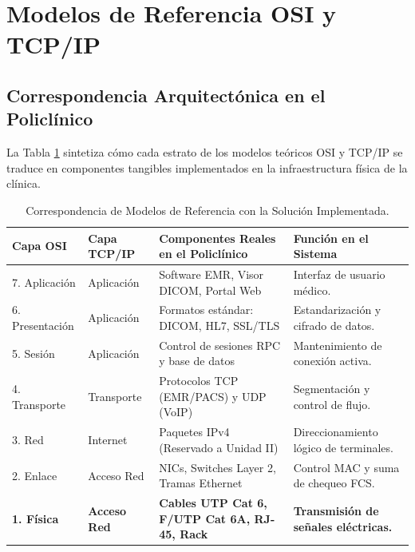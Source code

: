 \documentclass[11pt,a4paper]{article}
\begin{document}
\section{Modelos de Referencia OSI y TCP/IP}

\subsection{Correspondencia Arquitectónica en el Policlínico}
La Tabla \ref{tab:modelos} sintetiza cómo cada estrato de los modelos teóricos OSI y TCP/IP se traduce en componentes tangibles implementados en la infraestructura física de la clínica.

\begin{table}[h!]
\centering
\small
\caption{Correspondencia de Modelos de Referencia con la Solución Implementada.}
\label{tab:modelos}
\begin{tabularx}{\textwidth}{l l p{4.2cm} X}
\toprule
\textbf{Capa OSI} & \textbf{Capa TCP/IP} & \textbf{Componentes Reales en el Policlínico} & \textbf{Función en el Sistema} \\
\midrule
7. Aplicación & Aplicación & Software EMR, Visor DICOM, Portal Web & Interfaz de usuario médico. \\
6. Presentación & Aplicación & Formatos estándar: DICOM, HL7, SSL/TLS & Estandarización y cifrado de datos. \\
5. Sesión & Aplicación & Control de sesiones RPC y base de datos & Mantenimiento de conexión activa. \\
4. Transporte & Transporte & Protocolos TCP (EMR/PACS) y UDP (VoIP) & Segmentación y control de flujo. \\
3. Red & Internet & Paquetes IPv4 (Reservado a Unidad II) & Direccionamiento lógico de terminales. \\
2. Enlace & Acceso Red & NICs, Switches Layer 2, Tramas Ethernet & Control MAC y suma de chequeo FCS. \\
\textbf{1. Física} & \textbf{Acceso Red} & \textbf{Cables UTP Cat 6, F/UTP Cat 6A, RJ-45, Rack} & \textbf{Transmisión de señales eléctricas.} \\
\bottomrule
\end{tabularx}
\end{table}
\end{document}
